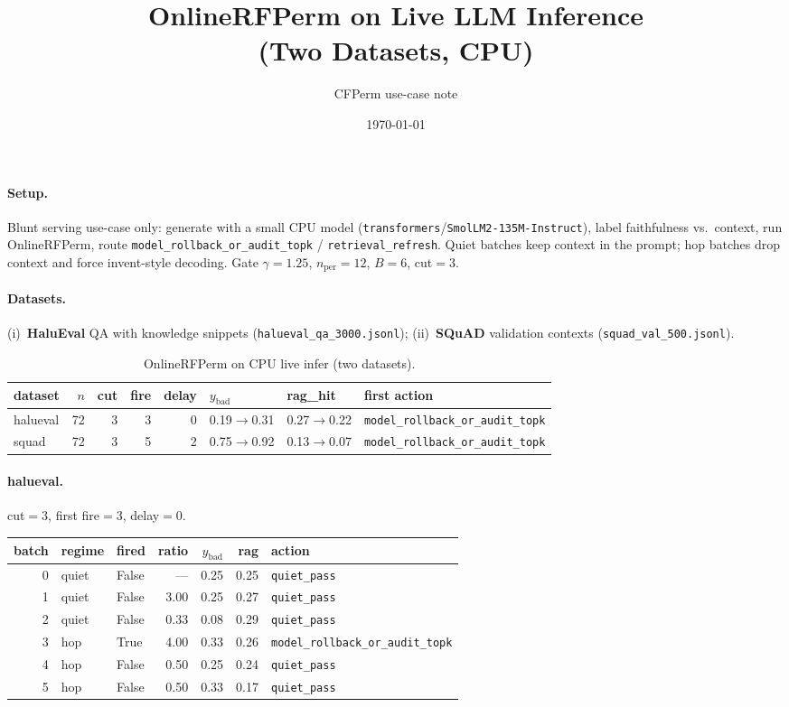 \documentclass[11pt]{article}
\title{OnlineRFPerm on Live LLM Inference\\(Two Datasets, CPU)}
\author{CFPerm use-case note}
\date{\today}
\begin{document}
\maketitle

\paragraph{Setup.}
Blunt serving use-case only: generate with a small CPU model (\texttt{transformers}/\texttt{SmolLM2-135M-Instruct}), label faithfulness vs.\ context, run OnlineRFPerm, route \texttt{model\_rollback\_or\_audit\_topk} / \texttt{retrieval\_refresh}. Quiet batches keep context in the prompt; hop batches drop context and force invent-style decoding. Gate $\gamma=1.25$, $n_{\mathrm{per}}=12$, $B=6$, cut$=3$.

\paragraph{Datasets.}
(i)~\textbf{HaluEval} QA with knowledge snippets (\texttt{halueval\_qa\_3000.jsonl}); (ii)~\textbf{SQuAD} validation contexts (\texttt{squad\_val\_500.jsonl}).

\begin{table}[h]
\centering
\caption{OnlineRFPerm on CPU live infer (two datasets).}
\begin{tabular}{lrrrrlll}
\toprule
dataset & $n$ & cut & fire & delay & $y_{\mathrm{bad}}$ & rag\_hit & first action \\
\midrule
halueval & 72 & 3 & 3 & 0 & 0.19$\to$0.31 & 0.27$\to$0.22 & \texttt{model\_rollback\_or\_audit\_topk} \\
squad & 72 & 3 & 5 & 2 & 0.75$\to$0.92 & 0.13$\to$0.07 & \texttt{model\_rollback\_or\_audit\_topk} \\
\bottomrule
\end{tabular}
\end{table}

\paragraph{halueval.} cut$=3$, first fire$=3$, delay$=0$.
\begin{center}\small
\begin{tabular}{rllrrrl}
\toprule batch & regime & fired & ratio & $y_{\mathrm{bad}}$ & rag & action \\ \midrule
0 & quiet & False & --- & 0.25 & 0.25 & \texttt{quiet\_pass} \\
1 & quiet & False & 3.00 & 0.25 & 0.27 & \texttt{quiet\_pass} \\
2 & quiet & False & 0.33 & 0.08 & 0.29 & \texttt{quiet\_pass} \\
3 & hop & True & 4.00 & 0.33 & 0.26 & \texttt{model\_rollback\_or\_audit\_topk} \\
4 & hop & False & 0.50 & 0.25 & 0.24 & \texttt{quiet\_pass} \\
5 & hop & False & 0.50 & 0.33 & 0.17 & \texttt{quiet\_pass} \\
\bottomrule\end{tabular}\end{center}
\end{document}
